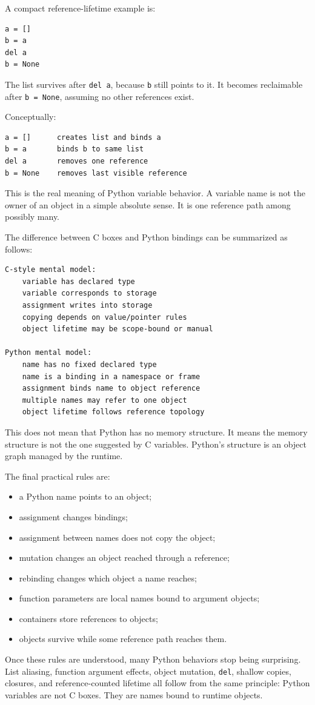 A compact reference-lifetime example is:

\begin{verbatim}
a = []
b = a
del a
b = None
\end{verbatim}

The list survives after \texttt{del a}, because \texttt{b} still points to it. It becomes reclaimable after \texttt{b = None}, assuming no other references exist.

Conceptually:

\begin{verbatim}
a = []      creates list and binds a
b = a       binds b to same list
del a       removes one reference
b = None    removes last visible reference
\end{verbatim}

This is the real meaning of Python variable behavior. A variable name is not the owner of an object in a simple absolute sense. It is one reference path among possibly many.

The difference between C boxes and Python bindings can be summarized as follows:

\begin{verbatim}
C-style mental model:
    variable has declared type
    variable corresponds to storage
    assignment writes into storage
    copying depends on value/pointer rules
    object lifetime may be scope-bound or manual

Python mental model:
    name has no fixed declared type
    name is a binding in a namespace or frame
    assignment binds name to object reference
    multiple names may refer to one object
    object lifetime follows reference topology
\end{verbatim}

This does not mean that Python has no memory structure. It means the memory structure is not the one suggested by C variables. Python's structure is an object graph managed by the runtime.

The final practical rules are:

\begin{itemize}
    \item a Python name points to an object;
    \item assignment changes bindings;
    \item assignment between names does not copy the object;
    \item mutation changes an object reached through a reference;
    \item rebinding changes which object a name reaches;
    \item function parameters are local names bound to argument objects;
    \item containers store references to objects;
    \item objects survive while some reference path reaches them.
\end{itemize}

Once these rules are understood, many Python behaviors stop being surprising. List aliasing, function argument effects, object mutation, \texttt{del}, shallow copies, closures, and reference-counted lifetime all follow from the same principle: Python variables are not C boxes. They are names bound to runtime objects.
